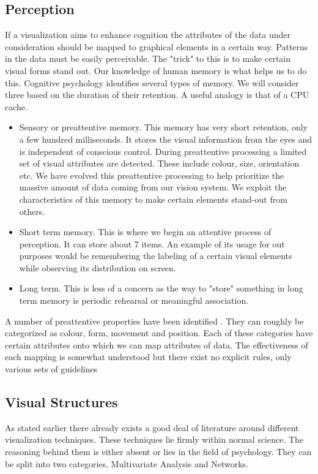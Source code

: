 \documentclass[a4paper, 10pt, titlepage]{article}
\begin{document}
\subsection{Perception}
If a visualization aims to enhance cognition the attributes of the data under consideration should be mapped to graphical elements in a certain way. Patterns in the data must be easily perceivable. The "trick" to this is to make certain visual forms stand out. Our knowledge of human memory is what helps us to do this. Cognitive psychology identifies several types of memory. We will consider three based on the duration of their retention. A useful analogy is that of a CPU cache.
\begin{itemize}
\item Sensory or preattentive memory. This memory has very short retention, only a few hundred milliseconds. It stores the visual information from the eyes and is independent of conscious control. During preattentive processing a limited set of visual attributes are detected. These include colour, size, orientation etc. We have evolved this preattentive processing to help prioritize the massive amount of data coming from our vision system. We exploit the characteristics of this memory to make certain elements stand-out from others.
\item Short term memory. This is where we begin an attentive process of perception. It can store about 7 items. An example of its usage for out purposes would be remembering the labeling of a certain visual elements while observing its distribution on screen.
\item Long term. This is less of a concern as the way to "store" something in long term memory is periodic rehearsal or meaningful association.
\end{itemize}
 A number of preattentive properties have been identified \cite{treisman1985preattentive}. They can roughly be categorized as colour, form, movement and position. Each of these categories have certain attributes onto which we can map attributes of data. The effectiveness of each mapping is somewhat understood but there exist no explicit rules, only various sets of guidelines \cite{few2004show} 

\subsection{Visual Structures}
As stated earlier there already exists a good deal of literature around different visualization techniques. These techniques lie firmly within normal science. The reasoning behind them is either absent or lies in the field of psychology. They can be split into two categories, Multivariate Analysis and Networks.
\end{document}
